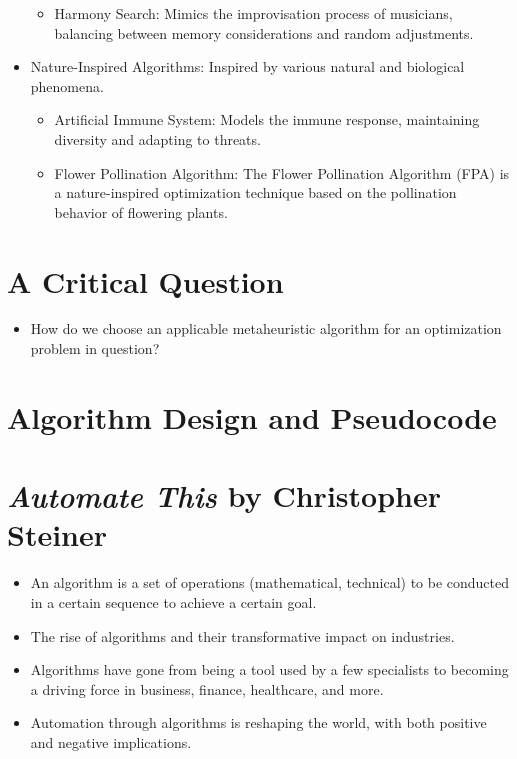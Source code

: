 \documentclass[
  letterpaper,
  DIV=11,
  numbers=noendperiod]{scrreprt}
\providecommand{\tightlist}{%
  \setlength{\itemsep}{0pt}\setlength{\parskip}{0pt}}\usepackage{longtable,booktabs,array}
\begin{document}
\begin{itemize}
  \begin{itemize}
  \tightlist
  \item
    Harmony Search: Mimics the improvisation process of musicians,
    balancing between memory considerations and random adjustments.
  \end{itemize}
\item
  Nature-Inspired Algorithms: Inspired by various natural and biological
  phenomena.

  \begin{itemize}
  \tightlist
  \item
    Artificial Immune System: Models the immune response, maintaining
    diversity and adapting to threats.
  \item
    Flower Pollination Algorithm: The Flower Pollination Algorithm (FPA)
    is a nature-inspired optimization technique based on the pollination
    behavior of flowering plants.
  \end{itemize}
\end{itemize}


\chapter{A Critical Question}\label{a-critical-question}

\begin{itemize}
\tightlist
\item
  How do we choose an applicable metaheuristic algorithm for an
  optimization problem in question?
\end{itemize}


\chapter{Algorithm Design and
Pseudocode}\label{algorithm-design-and-pseudocode}


\chapter{\texorpdfstring{\emph{Automate This} by Christopher
Steiner}{Automate This by Christopher Steiner}}\label{automate-this-by-christopher-steiner}

\begin{itemize}
\tightlist
\item
  An algorithm is a set of operations (mathematical, technical) to be
  conducted in a certain sequence to achieve a certain goal.
\item
  The rise of algorithms and their transformative impact on industries.
\item
  Algorithms have gone from being a tool used by a few specialists to
  becoming a driving force in business, finance, healthcare, and more.
\item
  Automation through algorithms is reshaping the world, with both
  positive and negative implications.
\end{itemize}
\end{document}
